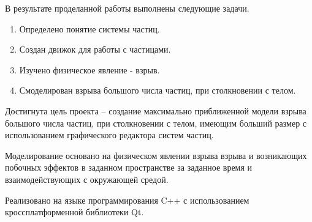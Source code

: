 \Conclusion %

\hfill

В результате проделанной работы выполнены следующие задачи. 
\begin{enumerate}
	\item Определено понятие системы частиц. 
	\item Создан движок для работы с частицами. 
	\item Изучено физическое явление - взрыв. 
	\item Смоделирован взрыва большого числа частиц, при столкновении с телом. 
\end{enumerate}

Достигнута цель проекта -- создание максимально приближенной модели взрыва большого числа частиц, при столкновении с телом, имеющим больший размер с использованием графического редактора систем частиц. 

Моделирование основано на физическом явлении взрыва взрыва и возникающих побочных эффектов в заданном пространстве за заданное время и взаимодействующих с окружающей средой. 

Реализовано на языке программирования C++ с использованием кроссплатформенной библиотеки Qt. 
